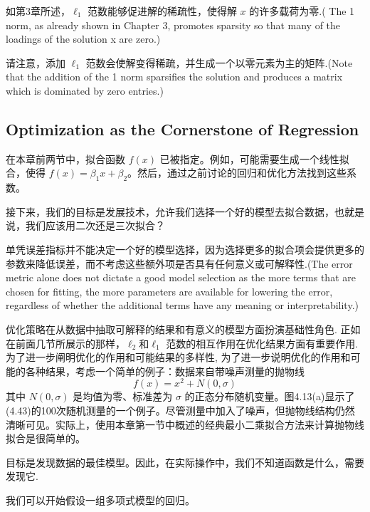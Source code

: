 \documentclass{ctexart}
\begin{document}
    \vspace{10ex} %
    
    如第3章所述，\(\ell_1\) 范数能够促进解的稀疏性，使得解 \(x\) 的许多载荷为零.( The   1 norm, as already shown in Chapter 3, promotes sparsity so that many of the loadings of the solution x are zero.)

    请注意，添加 \(\ell_1\) 范数会使解变得稀疏，并生成一个以零元素为主的矩阵.(Note that the addition of the  1 norm sparsifies the solution and produces a matrix which is dominated by zero entries.)








    

\subsection{Optimization as the Cornerstone of Regression}

在本章前两节中，拟合函数 \( f(x) \) 已被指定。例如，可能需要生成一个线性拟合，使得 \( f(x) = \beta_1 x + \beta_2 \)。然后，通过之前讨论的回归和优化方法找到这些系数。

接下来，我们的目标是发展技术，允许我们选择一个好的模型去拟合数据，也就是说，我们应该用二次还是三次拟合？

单凭误差指标并不能决定一个好的模型选择，因为选择更多的拟合项会提供更多的参数来降低误差，而不考虑这些额外项是否具有任何意义或可解释性.(The error metric alone does not dictate a good model selection as the more terms that are chosen for fitting, the more parameters are available for lowering the error,  regardless of whether the additional terms have any meaning or interpretability.)

优化策略在从数据中抽取可解释的结果和有意义的模型方面扮演基础性角色.
正如在前面几节所展示的那样，\( \ell_2 \)和\( \ell_1 \) 范数的相互作用在优化结果方面有重要作用.为了进一步阐明优化的作用和可能结果的多样性,
为了进一步说明优化的作用和可能的各种结果，考虑一个简单的例子：数据来自带噪声测量的抛物线
\[ f(x) = x^2 + N(0, \sigma) \]
其中 \( N(0, \sigma) \) 是均值为零、标准差为 \( \sigma \) 的正态分布随机变量。图4.13(a)显示了(4.43)的100次随机测量的一个例子。尽管测量中加入了噪声，但抛物线结构仍然清晰可见。实际上，使用本章第一节中概述的经典最小二乘拟合方法来计算抛物线拟合是很简单的。

{\color{red}目标是发现数据的最佳模型。因此，在实际操作中，我们不知道函数是什么，需要发现它.}

我们可以开始假设一组多项式模型的回归。
\end{document}
